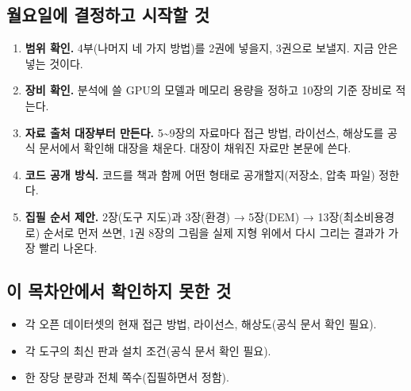 \hypertarget{uxc6d4uxc694uxc77cuxc5d0-uxacb0uxc815uxd558uxace0-uxc2dcuxc791uxd560-uxac83}{%
\subsection{월요일에 결정하고 시작할 것}\label{uxc6d4uxc694uxc77cuxc5d0-uxacb0uxc815uxd558uxace0-uxc2dcuxc791uxd560-uxac83}}

\begin{enumerate}
\def\labelenumi{\arabic{enumi}.}
\tightlist
\item
  \textbf{범위 확인.} 4부(나머지 네 가지 방법)를 2권에 넣을지, 3권으로 보낼지. 지금 안은 넣는 것이다.
\item
  \textbf{장비 확인.} 분석에 쓸 GPU의 모델과 메모리 용량을 정하고 10장의 기준 장비로 적는다.
\item
  \textbf{자료 출처 대장부터 만든다.} 5\textasciitilde9장의 자료마다 접근 방법, 라이선스, 해상도를 공식 문서에서 확인해 대장을 채운다. 대장이 채워진 자료만 본문에 쓴다.
\item
  \textbf{코드 공개 방식.} 코드를 책과 함께 어떤 형태로 공개할지(저장소, 압축 파일) 정한다.
\item
  \textbf{집필 순서 제안.} 2장(도구 지도)과 3장(환경) → 5장(DEM) → 13장(최소비용경로) 순서로 먼저 쓰면, 1권 8장의 그림을 실제 지형 위에서 다시 그리는 결과가 가장 빨리 나온다.
\end{enumerate}

\hypertarget{uxc774-uxbaa9uxcc28uxc548uxc5d0uxc11c-uxd655uxc778uxd558uxc9c0-uxbabbuxd55c-uxac83}{%
\subsection{이 목차안에서 확인하지 못한 것}\label{uxc774-uxbaa9uxcc28uxc548uxc5d0uxc11c-uxd655uxc778uxd558uxc9c0-uxbabbuxd55c-uxac83}}

\begin{itemize}
\tightlist
\item
  각 오픈 데이터셋의 현재 접근 방법, 라이선스, 해상도(공식 문서 확인 필요).
\item
  각 도구의 최신 판과 설치 조건(공식 문서 확인 필요).
\item
  한 장당 분량과 전체 쪽수(집필하면서 정함).
\end{itemize}
